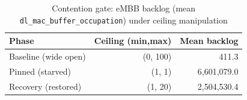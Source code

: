 \begin{table}[t]
\centering
\caption{Contention gate: eMBB backlog (mean \texttt{dl\_mac\_buffer\_occupation}) under ceiling manipulation}
\label{tab:contention}
\begin{tabular}{@{}lrr@{}}
\toprule
Phase & Ceiling (min,max) & Mean backlog \\
\midrule
Baseline (wide open) & (0, 100) & 411.3 \\
Pinned (starved) & (1, 1) & 6{,}601{,}079.0 \\
Recovery (restored) & (1, 20) & 2{,}504{,}530.4 \\
\bottomrule
\end{tabular}
\end{table}
